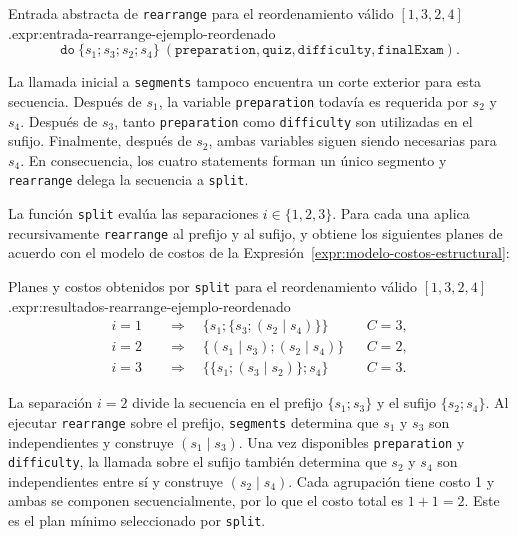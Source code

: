\begin{ReportExpression}{Entrada abstracta de \texttt{rearrange} para el reordenamiento válido $[1,3,2,4]$.}{expr:entrada-rearrange-ejemplo-reordenado}
\[
\texttt{do}\ \{s_1;s_3;s_2;s_4\}\
(\texttt{preparation}, \texttt{quiz}, \texttt{difficulty}, \texttt{finalExam}).
\]
\end{ReportExpression}

La llamada inicial a \texttt{segments} tampoco encuentra un corte exterior para esta secuencia. Después de $s_1$, la variable \texttt{preparation} todavía es requerida por $s_2$ y $s_4$. Después de $s_3$, tanto \texttt{preparation} como \texttt{difficulty} son utilizadas en el sufijo. Finalmente, después de $s_2$, ambas variables siguen siendo necesarias para $s_4$. En consecuencia, los cuatro statements forman un único segmento y \texttt{rearrange} delega la secuencia a \texttt{split}.

La función \texttt{split} evalúa las separaciones $i\in\{1,2,3\}$. Para cada una aplica recursivamente \texttt{rearrange} al prefijo y al sufijo, y obtiene los siguientes planes de acuerdo con el modelo de costos de la Expresión~\ref{expr:modelo-costos-estructural}:

\begin{ReportExpression}{Planes y costos obtenidos por \texttt{split} para el reordenamiento válido $[1,3,2,4]$.}{expr:resultados-rearrange-ejemplo-reordenado}
\[
\begin{aligned}
i=1 &\quad\Longrightarrow\quad
  \{s_1;\{s_3;(s_2\mid s_4)\}\}
  && C=3,\\
i=2 &\quad\Longrightarrow\quad
  \{(s_1\mid s_3);(s_2\mid s_4)\}
  && C=2,\\
i=3 &\quad\Longrightarrow\quad
  \{\{s_1;(s_3\mid s_2)\};s_4\}
  && C=3.
\end{aligned}
\]
\end{ReportExpression}

La separación $i=2$ divide la secuencia en el prefijo $\{s_1;s_3\}$ y el sufijo $\{s_2;s_4\}$. Al ejecutar \texttt{rearrange} sobre el prefijo, \texttt{segments} determina que $s_1$ y $s_3$ son independientes y construye $(s_1\mid s_3)$. Una vez disponibles \texttt{preparation} y \texttt{difficulty}, la llamada sobre el sufijo también determina que $s_2$ y $s_4$ son independientes entre sí y construye $(s_2\mid s_4)$. Cada agrupación tiene costo 1 y ambas se componen secuencialmente, por lo que el costo total es $1+1=2$. Este es el plan mínimo seleccionado por \texttt{split}.

